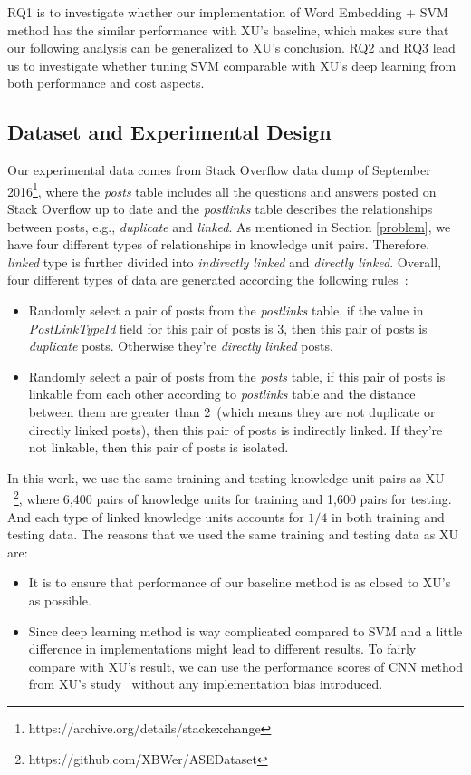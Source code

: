 \documentclass[sigconf]{acmart}
\theoremstyle{break}
\newcommand{\bi}{\begin{itemize}[leftmargin=0.4cm]}
\newcommand{\ei}{\end{itemize}}
\begin{document}
 RQ1 is to investigate whether our implementation of Word Embedding + SVM method has
 the similar performance with XU's baseline, which makes sure that our following 
 analysis can be generalized to XU's conclusion. RQ2 and RQ3 lead us to
 investigate whether tuning SVM comparable with XU's deep learning from both 
 performance and cost aspects.
 


\subsection{Dataset and Experimental Design}
Our experimental data comes from Stack Overflow data dump of 
September 2016\footnote{https://archive.org/details/stackexchange},
where the {\it posts} table includes all the questions and answers posted on Stack Overflow
up to date and the {\it postlinks} table describes the relationships between posts, 
e.g., {\it duplicate} and {\it linked}. As mentioned in Section
\ref{problem}, we have four different types of relationships in knowledge unit pairs.
Therefore,  {\it linked} type is further divided into {\it indirectly linked} and {\it directly linked}.
Overall, four different types of data are generated according the following rules~\cite{xu2016predicting}:
\bi
\item Randomly select a pair of posts from the {\it postlinks} table, if the value
in  {\it PostLinkTypeId} field for this pair of posts is $3$, then this pair of posts is {\it duplicate} posts. 
Otherwise they're {\it directly linked} posts.

\item Randomly select a pair of posts from the {\it posts} table, if this pair of posts is linkable from each other according to
{\it postlinks} table and the distance between them are greater than 2~(which means they are not duplicate or directly linked posts), then this pair of posts is indirectly linked. If they're
not linkable, then this pair of posts is {isolated}.
\ei

In this work, we use the same training and testing
knowledge unit pairs as XU ~\cite{xu2016predicting}\footnote{https://github.com/XBWer/ASEDataset}, 
where 6,400 pairs of  knowledge units for training and 1,600 pairs for testing. And each type 
of linked knowledge units accounts for $1/4$ in both training and testing data. The reasons that
we used the same training and testing data as XU are:
\bi
\item It is to ensure that  performance of our baseline method is as closed to XU's as possible.
\item Since deep learning method is way complicated compared to SVM and a little difference in implementations
might lead to different results. To fairly compare with XU's result, we can use the  performance scores
of CNN method from XU's study~\cite{xu2016predicting} without any implementation bias introduced.
\ei
\end{document}
